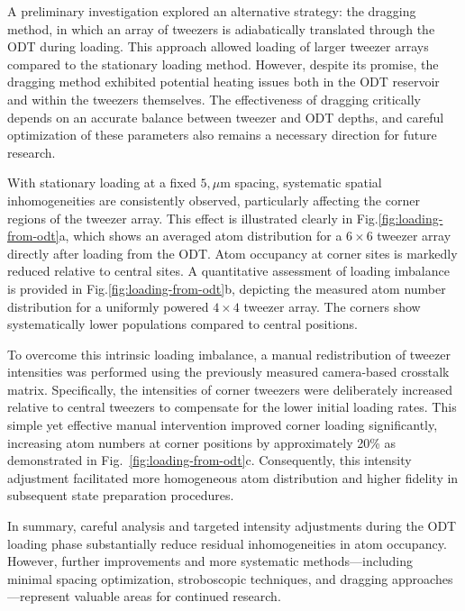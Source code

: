 A preliminary investigation explored an alternative strategy: the dragging method, in which an array of tweezers is adiabatically translated through the ODT during loading. This approach allowed loading of larger tweezer arrays compared to the stationary loading method. However, despite its promise, the dragging method exhibited potential heating issues both in the ODT reservoir and within the tweezers themselves. The effectiveness of dragging critically depends on an accurate balance between tweezer and ODT depths, and careful optimization of these parameters also remains a necessary direction for future research.

With stationary loading at a fixed $5,\mu$m spacing, systematic spatial inhomogeneities are consistently observed, particularly affecting the corner regions of the tweezer array. This effect is illustrated clearly in Fig.\ref{fig:loading-from-odt}a, which shows an averaged atom distribution for a $6\times6$ tweezer array directly after loading from the ODT. Atom occupancy at corner sites is markedly reduced relative to central sites. A quantitative assessment of loading imbalance is provided in Fig.\ref{fig:loading-from-odt}b, depicting the measured atom number distribution for a uniformly powered $4\times4$ tweezer array. The corners show systematically lower populations compared to central positions.

To overcome this intrinsic loading imbalance, a manual redistribution of tweezer intensities was performed using the previously measured camera-based crosstalk matrix. Specifically, the intensities of corner tweezers were deliberately increased relative to central tweezers to compensate for the lower initial loading rates. This simple yet effective manual intervention improved corner loading significantly, increasing atom numbers at corner positions by approximately 20\% as demonstrated in Fig.~\ref{fig:loading-from-odt}c. Consequently, this intensity adjustment facilitated more homogeneous atom distribution and higher fidelity in subsequent state preparation procedures.

In summary, careful analysis and targeted intensity adjustments during the ODT loading phase substantially reduce residual inhomogeneities in atom occupancy. However, further improvements and more systematic methods—including minimal spacing optimization, stroboscopic techniques, and dragging approaches—represent valuable areas for continued research.

